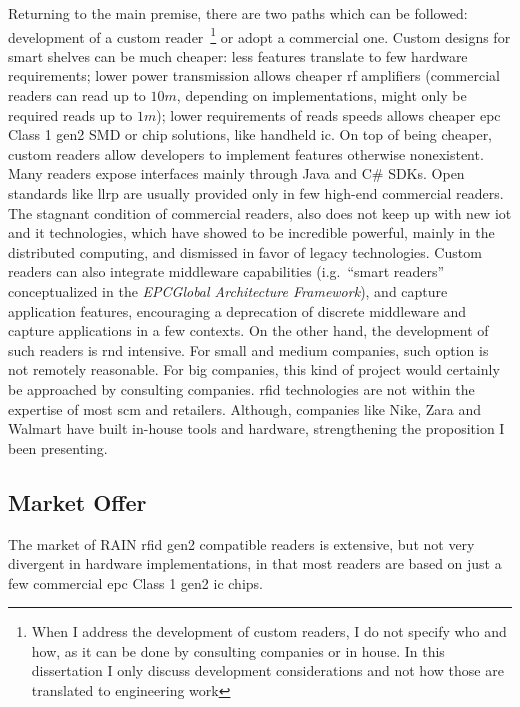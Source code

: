 Returning to the main premise, there are two paths which can be followed: development of a custom reader~\footnote{When I address the development of custom readers, I do not specify who and how, as it can be done by consulting companies or in house. In this dissertation I only discuss development considerations and not how those are translated to engineering work} or adopt a commercial one. 
Custom designs for smart shelves can be much cheaper: less features translate to few hardware requirements; lower power transmission allows cheaper \ac{rf} amplifiers (commercial readers can read up to $10m$, depending on implementations, might only be required reads up to $1m$); lower requirements of reads speeds allows cheaper \ac{epc} Class 1 \ac{gen2} SMD or chip solutions, like handheld \acs{ic}.
On top of being cheaper, custom readers allow developers to implement features otherwise nonexistent. Many readers expose interfaces mainly through Java and C\# SDKs. Open standards like \ac{llrp} are usually provided only in few high-end commercial readers. The stagnant condition of commercial readers, also does not keep up with new \ac{iot} and \ac{it} technologies, which have showed to be incredible powerful, mainly in the distributed computing, and dismissed in favor of legacy technologies.
Custom readers can also integrate middleware capabilities (i.g.\ ``smart readers'' conceptualized in the \emph{EPCGlobal Architecture Framework}), and capture application features, encouraging a deprecation of discrete middleware and capture applications in a few contexts.
On the other hand, the development of such readers is \ac{rnd} intensive. For small and medium companies, such option is not remotely reasonable. 
For big companies, this kind of project would certainly be approached by consulting companies. \ac{rfid} technologies are not within the expertise of most \ac{scm} and retailers. Although, companies like Nike, Zara and Walmart have built in-house tools and hardware, strengthening the proposition I been presenting.

\subsection{Market Offer}

The market of RAIN \ac{rfid} \ac{gen2} compatible readers is extensive, but not very divergent in hardware implementations, in that most readers are based on just a few commercial \ac{epc} Class 1 \ac{gen2} \ac{ic} chips.

